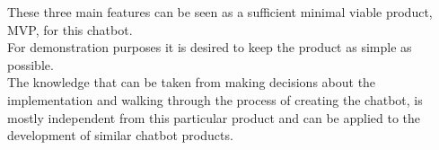 These three main features can be seen as a sufficient minimal viable product, MVP, for this chatbot.
\\
For demonstration purposes it is desired to keep the product as simple as possible.
\\
The knowledge that can be taken from making decisions about the implementation and walking through the process of creating the chatbot,
is mostly independent from this particular product and can be applied to the development of similar chatbot products.

